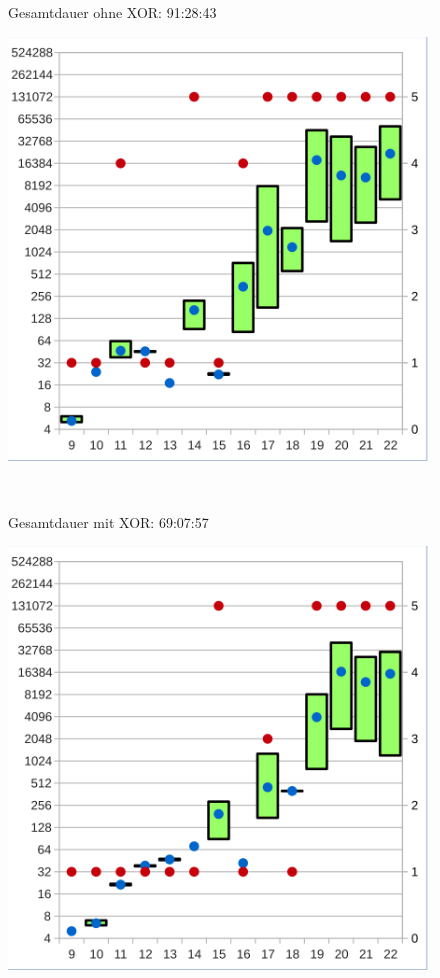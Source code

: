 \begin{figure}[!h]
  \centering
  \begin{minipage}[c]{0.45\textwidth}
  \begin{flushleft}Gesamtdauer ohne XOR: 91:28:43\end{flushleft}
  \includegraphics[scale=0.55]{images/data_modul_knf}
  \end{minipage}
  \begin{minipage}[c]{0.09\textwidth}
  ~~
  \end{minipage}
  \begin{minipage}[c]{0.45\textwidth}
  \begin{flushleft}Gesamtdauer mit XOR: 69:07:57\end{flushleft}
  \includegraphics[scale=0.55]{images/data_modul_xor}

\end{minipage}
\end{figure}
